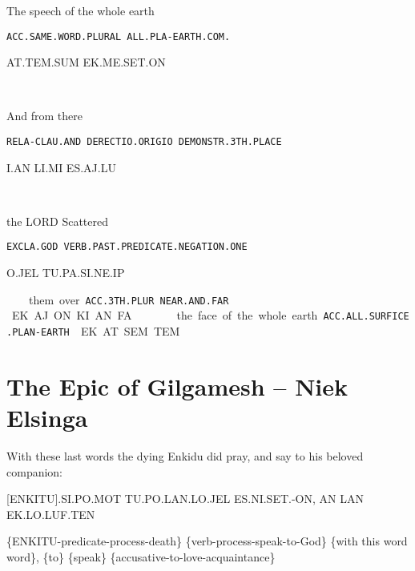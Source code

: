{\tu\pa\lis\nef\Atlansin
\drie

 

The speech			 of the whole earth 

{\tt ACC.SAME.WORD.PLURAL 	ALL.PLA-EARTH.COM. }

AT.TEM.SUM			EK.ME.SET.ON 

\at\tem\Atlansum~\ek\me\set\on
\drie

 

And 			from 			there 		

{\tt RELA-CLAU.AND	DERECTIO.ORIGIO      DEMONSTR.3TH.PLACE }

I.AN			LI.MI			ES.AJ.LU			 

\Atlani\an~\li\mi~\es\aj\lu


the LORD	Scattered 

{\tt EXCLA.GOD	VERB.PAST.PREDICATE.NEGATION.ONE }

O.JEL		TU.PA.SI.NE.IP    

\Atlano\jel~\tu\pa\si\Atlanne\ip
\drie

 

 them 		over 		 

{\tt ACC.3TH.PLUR	NEAR.AND.FAR	 }

EK.AJ.ON	KI.AN.FA               

\ek\aj\on~\ki\an\fa
\drie

  

the face of the whole earth. 

{\tt ACC.ALL.SURFICE.PLAN-EARTH }

EK.AT.SEM.TEM 

\ek\at\sem\tem
\drie
\vfill

\pagebreak
\section{The Epic of Gilgamesh -- {\small Niek Elsinga}}



\drie 
 

With these last words the dying Enkidu did pray, and say to his beloved companion:  
 
  [ENKITU].SI.PO.MOT TU.PO.LAN.LO.JEL ES.NI.SET.-ON, AN LAN EK.LO.LUF.TEN 

\{ENKITU-predicate-process-death\} \{verb-process-speak-to-God\} \{with this word word\}, \{to\} \{speak\} \{accusative-to-love-acquaintance\} 

\cartouche{\en\ki\tu}\si\po\mot~\tu\po\lan\lo\jel~~ \\ \es\Atlanni\set\on\comma \an\lan\ek\lo\luf\ten

}
